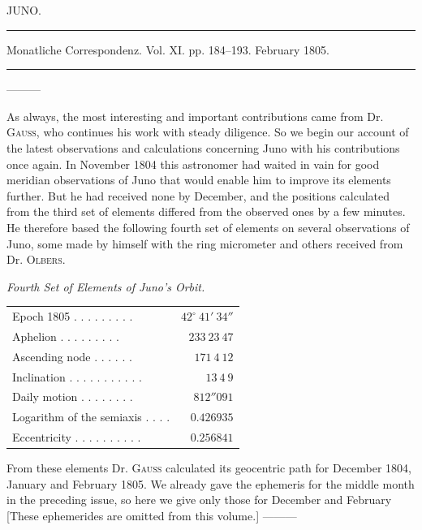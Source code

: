 \clearpage
{}
\hypertarget{native-265-lower}{}
\begin{center}
JUNO.

\rule{0.6\linewidth}{0.4pt}

Monatliche Correspondenz. Vol. XI. pp. 184–193. February 1805.

\rule{0.6\linewidth}{0.4pt}
\end{center}

—\quad—\quad—

As always, the most interesting and important contributions came from Dr. \textsc{Gauss}, who continues his work with steady diligence. So we begin our account of the latest observations and calculations concerning Juno with his contributions once again. In November 1804 this astronomer had waited in vain for good meridian observations of Juno that would enable him to improve its elements further. But he had received none by December, and the positions calculated from the third set of elements differed from the observed ones by a few minutes. He therefore based the following fourth set of elements on several observations of Juno, some made by himself with the ring micrometer and others received from Dr. \textsc{Olbers}.

\begin{center}
\emph{Fourth Set of Elements of Juno’s Orbit.}
\end{center}

\begin{center}
\begingroup\fontsize{9}{11}\selectfont\setlength{\tabcolsep}{3pt}\renewcommand{\arraystretch}{1.1}
\begin{tabular}{lr}
Epoch 1805 . . . . . . . . . & $42^\circ\ 41'\ 34''$ \\
Aphelion . . . . . . . . . & $233\ 23\ 47$ \\
Ascending node . . . . . . & $171\ 4\ 12$ \\
Inclination . . . . . . . . . . . & $13\ 4\ 9$ \\
Daily motion . . . . . . . . & $812''091$ \\
Logarithm of the semiaxis . . . . & $0.426935$ \\
Eccentricity . . . . . . . . . . & $0.256841$ \\
\end{tabular}\endgroup
\end{center}

\indent From these elements Dr. \textsc{Gauss} calculated its geocentric path for December 1804, January and February 1805. We already gave the ephemeris for the middle month in the preceding issue, so here we give only those for December and February [These ephemerides are omitted from this volume.] —\quad—\quad—

